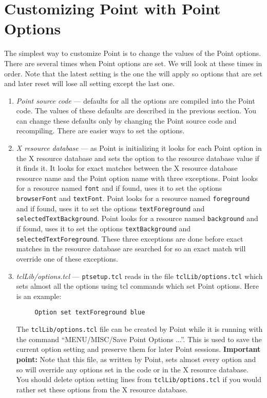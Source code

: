 





\section{Customizing Point with Point Options} \label{sect:customize1}

The simplest way to customize Point is to change the values
of the Point options.
There are several times when Point options are set.
We will look at these times in order.
Note that the latest setting is the one the will apply so options
that are set and later reset will lose all setting except the
last one.

\begin{enumerate}

\item {\it Point source code} ---
defaults for all the options are compiled into the Point code.
The values of these defaults are described in the previous section.
You can change these defaults only by changing the Point source
code and recompiling.
There are easier ways to set the options.

\item {\it X resource database} ---
as Point is initializing it looks for each Point option in the X
resource database and sets the option to the resource database
value if it finds it.
It looks for exact matches between the X resource database resource
name and the Point option name with three exceptions.
Point looks for a resource named {\tt font} and if found,
uses it to set the options {\tt browserFont} and {\tt textFont}.
Point looks for a resource named {\tt foreground} and if found,
uses it to set the options {\tt textForeground}
and {\tt selectedTextBackground}.
Point looks for a resource named {\tt background} and if found,
uses it to set the options {\tt textBackground}
and {\tt selectedTextForeground}.
These three exceptions are done before exact matches in the
resource database are searched for so an exact match will
override one of these exceptions.

\item {\it tclLib/options.tcl} ---
{\tt ptsetup.tcl} reads in the file {\tt tclLib/options.tcl}
which sets almost all the options using tcl commands which set
Point options.  Here is an example:
\begin{verbatim}
     Option set textForeground blue
\end{verbatim}
The {\tt tclLib/options.tcl} file can be created by Point while
it is running with the command ``MENU/MISC/Save Point Options ...''.
This is used to save the current option setting and preserve them
for later Point sessions.
{\bf Important point:}
Note that this file, as written by Point, sets almost every option
and so will override any options set in the code or in the X
resource database.
You should delete option setting lines from {\tt tclLib/options.tcl}
if you would rather set these options from the X resource database.


\end{enumerate}
